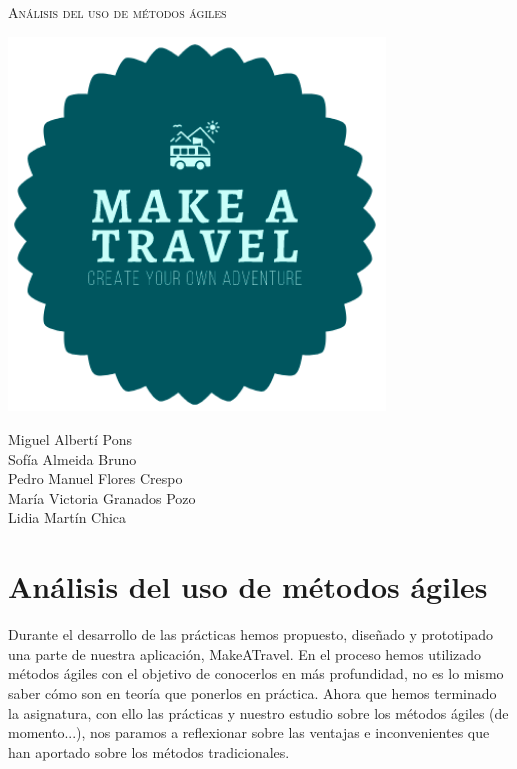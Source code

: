\documentclass[11pt]{article}
\begin{document}
\begin{titlepage}
\centering
\vspace{4.5cm}
{\scshape\LARGE Análisis del uso de métodos ágiles\par}
\vspace{1.5cm}

\includegraphics[width=10cm] {Logo}

\vspace{3cm}
{\scshape\large \par}
\vspace{1cm}

{Miguel Albertí Pons\\
Sofía Almeida Bruno\\
Pedro Manuel Flores Crespo\\
María Victoria Granados Pozo\\
Lidia Martín Chica
\par}

\end{titlepage}

\newpage
\section{Análisis del uso de métodos ágiles}
Durante el desarrollo de las prácticas hemos propuesto, diseñado y prototipado una parte de nuestra aplicación, MakeATravel. En el proceso hemos utilizado métodos ágiles con el objetivo de conocerlos en más profundidad, no es lo mismo saber cómo son en teoría que ponerlos en práctica. Ahora que hemos terminado la asignatura, con ello las prácticas y nuestro estudio sobre los métodos ágiles (de momento...), nos paramos a reflexionar sobre las ventajas e inconvenientes que han aportado sobre los métodos tradicionales.
\end{document}
